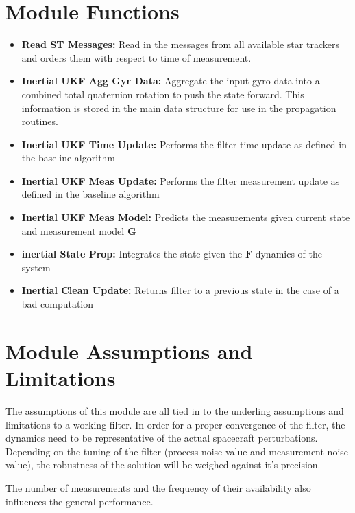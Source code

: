

\section{Module Functions}

\begin{itemize}
    \item \textbf{Read ST Messages: } Read in the messages from all available star trackers and orders them with respect to time of measurement. 
    \item \textbf{Inertial UKF Agg Gyr Data: } Aggregate the input gyro data into a combined total quaternion 
    rotation to push the state forward.  This information is stored in the 
    main data structure for use in the propagation routines.
    \item \textbf{Inertial UKF Time Update: } Performs the filter time update as defined in the baseline algorithm
    \item \textbf{Inertial UKF Meas Update: } Performs the filter measurement update as defined in the baseline algorithm
    \item \textbf{Inertial UKF Meas Model: } Predicts the measurements given current state and measurement model $\bm G$
    \item \textbf{inertial State Prop: } Integrates the state given the $\bm F$ dynamics of the system
    \item \textbf{Inertial Clean Update: } Returns filter to a previous state in the case of a bad computation
    \end{itemize}

\section{Module Assumptions and Limitations}

The assumptions of this module are all tied in to the underling assumptions and limitations to a working filter. 
In order for a proper convergence of the filter, the dynamics need to be representative of the actual spacecraft perturbations.
Depending on the tuning of the filter (process noise value and measurement noise value), the robustness of the solution will be weighed against it's precision. 

The number of measurements and the frequency of their availability also influences the general performance. 

